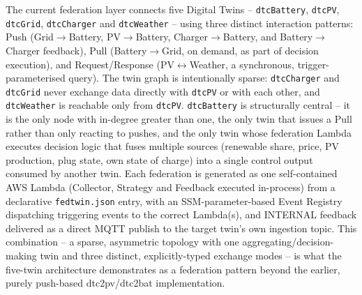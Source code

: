 \documentclass[11pt]{article}
\renewcommand{\_}{\textunderscore\allowbreak}
\begin{document}
The current federation layer connects five Digital Twins --
\texttt{dtcBattery}, \texttt{dtcPV}, \texttt{dtcGrid}, \texttt{dtcCharger}
and \texttt{dtcWeather} -- using three distinct interaction patterns: Push
(Grid$\rightarrow$Battery, PV$\rightarrow$Battery,
Charger$\rightarrow$Battery, and Battery$\rightarrow$Charger feedback),
Pull (Battery$\rightarrow$Grid, on demand, as part of decision execution),
and Request/Response (PV$\leftrightarrow$Weather, a synchronous,
trigger-parameterised query). The twin graph is intentionally sparse:
\texttt{dtcCharger} and \texttt{dtcGrid} never exchange data directly with
\texttt{dtcPV} or with each other, and \texttt{dtcWeather} is reachable only
from \texttt{dtcPV}. \texttt{dtcBattery} is structurally central -- it is the
only node with in-degree greater than one, the only twin that issues a
Pull rather than only reacting to pushes, and the only twin whose federation
Lambda executes decision logic that fuses multiple sources
(renewable share, price, PV production, plug state, own state of charge)
into a single control output consumed by another twin. Each federation is
generated as one self-contained AWS Lambda (Collector, Strategy and Feedback
executed in-process) from a declarative \texttt{fedtwin.json} entry, with an
SSM-parameter-based Event Registry dispatching triggering events to the
correct Lambda(s), and INTERNAL feedback delivered as a direct MQTT publish
to the target twin's own ingestion topic. This combination -- a sparse,
asymmetric topology with one aggregating/decision-making twin and three
distinct, explicitly-typed exchange modes -- is what the five-twin
architecture demonstrates as a federation pattern beyond the earlier,
purely push-based dtc2pv/dtc2bat implementation.
\end{document}
